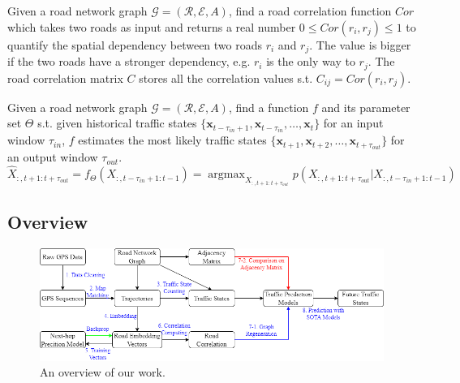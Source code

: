 \begin{problem}
    Given a road network graph $\mathcal{G}=(\mathcal{R}, \mathcal{E}, A)$, find a road correlation function $Cor$ which takes two roads as input and returns a real number $0\leqslant Cor(r_i, r_j)\leqslant 1$ to quantify the spatial dependency between two roads $r_i$ and $r_j$. The value is bigger if the two roads have a stronger dependency, e.g. $r_i$ is the only way to $r_j$. The road correlation matrix $C$ stores all the correlation values s.t. $C_{ij}=Cor(r_i, r_j)$.
\end{problem}

\begin{problem}
    Given a road network graph $\mathcal{G}=(\mathcal{R}, \mathcal{E}, A)$, find a function $f$ and its parameter set $\Theta$ s.t. given historical traffic states $\{\mathbf{x}_{t-\tau_{in}+1}, \mathbf{x}_{t-\tau_{in}}, \dots, \mathbf{x}_t \}$ for an input window $\tau_{in}$, $f$ estimates the most likely traffic states $\{\mathbf{x}_{t+1}, \mathbf{x}_{t+2}, \dots, \mathbf{x}_{t+\tau_{out}} \}$ for an output window $\tau_{out}$.
    \begin{equation}
        \hat X_{:, t+1:t+\tau_{out}}=f_\Theta(X_{:, t-\tau_{in}+1:t-1})=\mathop{\arg\max}_{X_{:, t+1:t+\tau_{out}}} p(X_{:, t+1:t+\tau_{out}}|X_{:, t-\tau_{in}+1:t-1})
    \end{equation}
\end{problem}

\subsection{Overview}
\begin{figure}[htb]
    \centering
    \includegraphics[width=\textwidth]{images/overview.drawio.png}
    \caption{An overview of our work.}
    \label{fig: overview}
\end{figure}
  